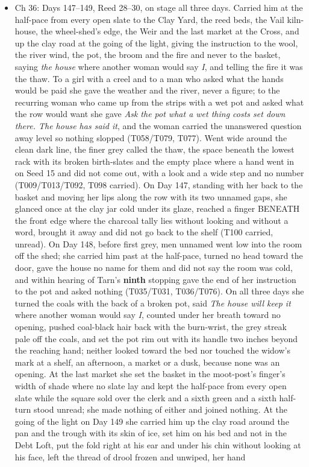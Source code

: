 \documentclass{design/chronicle}
\begin{document}
{\begin{itemize}[leftmargin=1.4em,itemsep=1pt,topsep=3pt,parsep=0pt]
\end{itemize}

\begin{itemize}[leftmargin=1.4em,itemsep=1pt,topsep=3pt,parsep=0pt]

\item Ch 36: Days 147–149, Reed 28–30, on stage all three days. Carried him at the half-pace from every open slate to the Clay Yard, the reed beds, the Vail kiln-house, the wheel-shed’s edge, the Weir and the last market at the Cross, and up the clay road at the going of the light, giving the instruction to the wool, the river wind, the pot, the broom and the fire and never to the basket, saying \emph{the house} where another woman would say \emph{I}, and telling the fire it was the thaw. To a girl with a creel and to a man who asked what the hands would be paid she gave the weather and the river, never a figure; to the recurring woman who came up from the strips with a wet pot and asked what the row would want she gave \emph{Ask the pot what a wet thing costs set down there. The house has said it}, and the woman carried the unanswered question away level so nothing slopped (T058/T079, T077). Went wide around the clean dark line, the finer grey called the thaw, the space beneath the lowest rack with its broken birth-slates and the empty place where a hand went in on Seed 15 and did not come out, with a look and a wide step and no number (T009/T013/T092, T098 carried). On Day 147, standing with her back to the basket and moving her lips along the row with its two unnamed gaps, she glanced once at the clay jar cold under its glaze, reached a finger BENEATH the front edge where the charcoal tally lies without looking and without a word, brought it away and did not go back to the shelf (T100 carried, unread). On Day 148, before first grey, men unnamed went low into the room off the shed; she carried him past at the half-pace, turned no head toward the door, gave the house no name for them and did not say the room was cold, and within hearing of Tarn’s \textbf{ninth} stopping gave the end of her instruction to the pot and asked nothing (T035/T031, T036/T076). On all three days she turned the coals with the back of a broken pot, said \emph{The house will keep it} where another woman would say \emph{I}, counted under her breath toward no opening, pushed coal-black hair back with the burn-wrist, the grey streak pale off the coals, and set the pot rim out with its handle two inches beyond the reaching hand; neither looked toward the bed nor touched the widow’s mark at a shelf, an afternoon, a market or a dusk, because none was an opening. At the last market she set the basket in the moot-post’s finger’s width of shade where no slate lay and kept the half-pace from every open slate while the square sold over the clerk and a sixth green and a sixth half-turn stood unread; she made nothing of either and joined nothing. At the going of the light on Day 149 she carried him up the clay road around the pan and the trough with its skin of ice, set him on his bed and not in the Debt Loft, put the fold right at his ear and under his chin without looking at his face, left the thread of drool frozen and unwiped, her hand 
\end{itemize}}
\end{document}
